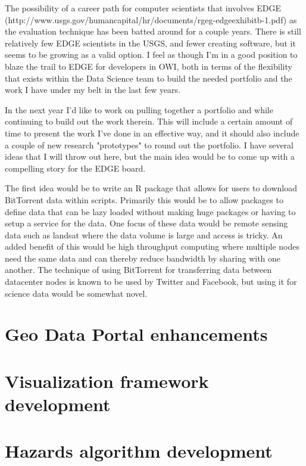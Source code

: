 \documentclass{article}
\begin{document}
The possibility of a career path for computer scientists that involves EDGE (http://www.usgs.gov/humancapital/hr/documents/rgeg-edgeexhibitb-1.pdf) as the evaluation technique has been batted around for a couple years.
There is still relatively few EDGE scientists in the USGS, and fewer creating software, but it seems to be growing as a valid option.
I feel as though I'm in a good position to blaze the trail to EDGE for developers in OWI, both in terms of the flexibility that exists within the Data Science team to build the needed portfolio and the work I have under my belt in the last few years.

In the next year I'd like to work on pulling together a portfolio and while continuing to build out the work therein.
This will include a certain amount of time to present the work I've done in an effective way, and it should also include a couple of new research "prototypes" to round out the portfolio.
I have several ideas that I will throw out here, but the main idea would be to come up with a compelling story for the EDGE board.

The first idea would be to write an R package that allows for users to download BitTorrent data within scripts.
Primarily this would be to allow packages to define data that can be lazy loaded without making huge packages or having to setup a service for the data.
One focus of these data would be remote sensing data such as landsat where the data volume is large and access is tricky.
An added benefit of this would be high throughput computing where multiple nodes need the same data and can thereby reduce bandwidth by sharing with one another.
The technique of using BitTorrent for transferring data between datacenter nodes is known to be used by Twitter and Facebook, but using it for science data would be somewhat novel.


\section{Geo Data Portal enhancements}


\section{Visualization framework development}


\section{Hazards algorithm development}
\end{document}
